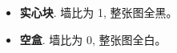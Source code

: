 \documentclass{article}
\begin{document}
\begin{itemize}[leftmargin=*, itemsep=0pt, topsep=0pt]
\item \textbf{实心块}. 墙比为 1, 整张图全黑。
\item \textbf{空盒}. 墙比为 0, 整张图全白。
\end{itemize}
\end{document}
